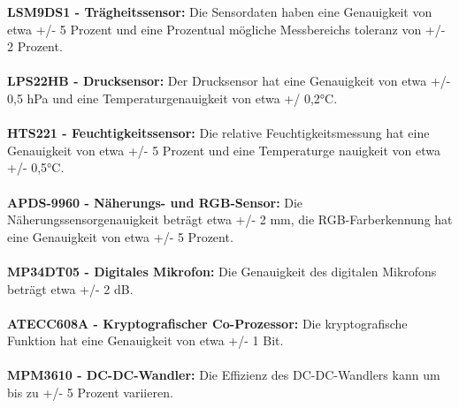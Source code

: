 \textbf{LSM9DS1 - Trägheitssensor:} Die Sensordaten haben eine Genauigkeit von etwa +/- 5 Prozent und eine Prozentual mögliche Messbereichs
toleranz von +/- 2 Prozent.
\\\\
\textbf{LPS22HB - Drucksensor:} Der Drucksensor hat eine Genauigkeit von etwa +/- 0,5 hPa und eine Temperaturgenauigkeit von etwa +/
0,2°C.
\\\\
\textbf{HTS221 - Feuchtigkeitssensor:} Die relative Feuchtigkeitsmessung hat eine Genauigkeit von etwa +/- 5 Prozent und eine Temperaturge
nauigkeit von etwa +/- 0,5°C.
\\\\
\textbf{APDS-9960 - Näherungs- und RGB-Sensor:} Die Näherungssensorgenauigkeit beträgt etwa +/- 2 mm, die RGB-Farberkennung hat eine Genauigkeit von etwa +/- 5 Prozent.
\\\\
\textbf{MP34DT05 - Digitales Mikrofon:} Die Genauigkeit des digitalen Mikrofons beträgt etwa +/- 2 dB.
\\\\
\textbf{ATECC608A - Kryptografischer Co-Prozessor:} Die kryptografische Funktion hat eine Genauigkeit von etwa +/- 1 Bit.
\\\\
\textbf{MPM3610 - DC-DC-Wandler:} Die Effizienz des DC-DC-Wandlers kann um bis zu +/- 5 Prozent variieren.
\\
